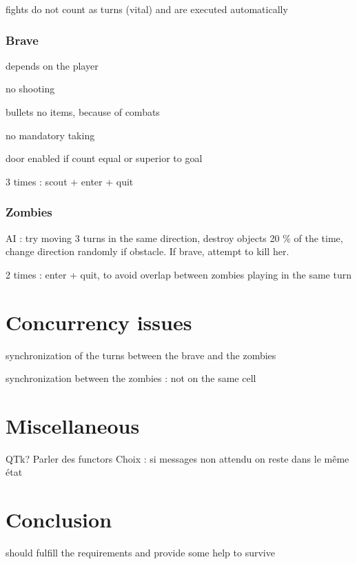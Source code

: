 \documentclass[11pt,a4paper]{article}
\begin{document}
fights do not count as turns (vital) and are executed automatically

\subsubsection{Brave}
depends on the player

no shooting

bullets no items, because of combats

no mandatory taking

door enabled if count equal or superior to goal

3 times : scout + enter + quit

\subsubsection{Zombies}
AI : try moving 3 turns in the same direction, destroy objects 20 \% of the time, change direction randomly if obstacle. If brave, attempt to kill her.

2 times : enter + quit, to avoid overlap between zombies playing in the same turn


\section{Concurrency issues}
synchronization of the turns between the brave and the zombies

synchronization between the zombies : not on the same cell


\section{Miscellaneous}
QTk?
Parler des functors
 Choix : si messages non attendu on reste dans le même état
 
    
\section*{Conclusion}
should fulfill the requirements and provide some help to survive
    
\end{document}
